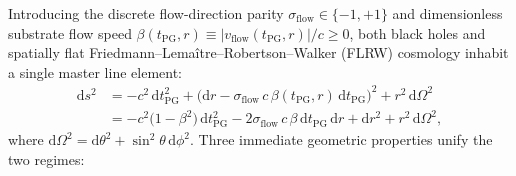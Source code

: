 \documentclass[11pt,a4paper]{article}
\theoremstyle{remark}
\begin{document}
Introducing the discrete flow-direction parity $\sigma_{\mathrm{flow}} \in \{-1, +1\}$ and dimensionless substrate flow speed $\beta(t_{\mathrm{PG}}, r) \equiv |v_{\mathrm{flow}}(t_{\mathrm{PG}}, r)|/c \ge 0$, both black holes and spatially flat Friedmann--Lema\^itre--Robertson--Walker (FLRW) cosmology inhabit a single master line element:
\begin{align}
  \mathrm{d}s^2 &= -c^2\,\mathrm{d}t_{\mathrm{PG}}^2 + \bigl(\mathrm{d}r - \sigma_{\mathrm{flow}}\,c\,\beta(t_{\mathrm{PG}}, r)\,\mathrm{d}t_{\mathrm{PG}}\bigr)^2 + r^2\,\mathrm{d}\Omega^2 \nonumber\\
  &= -c^2\bigl(1 - \beta^2\bigr)\,\mathrm{d}t_{\mathrm{PG}}^2 - 2\sigma_{\mathrm{flow}}\,c\,\beta\,\mathrm{d}t_{\mathrm{PG}}\,\mathrm{d}r + \mathrm{d}r^2 + r^2\,\mathrm{d}\Omega^2,
  \label{eq:master_pg_metric}
\end{align}
where $\mathrm{d}\Omega^2 = \mathrm{d}\theta^2 + \sin^2\theta\,\mathrm{d}\phi^2$. Three immediate geometric properties unify the two regimes:
\end{document}
